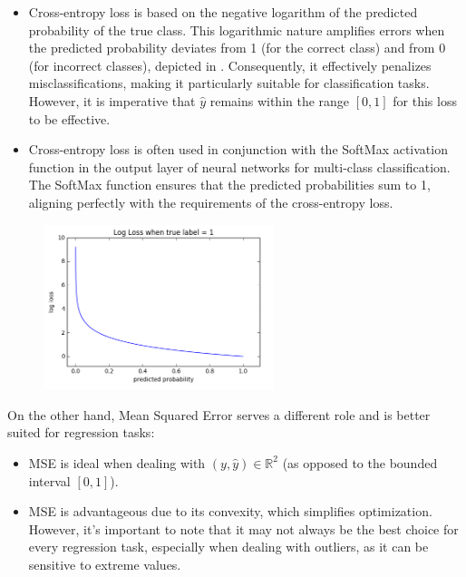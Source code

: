 \begin{itemize}
    \item Cross-entropy loss is based on the negative logarithm of the predicted probability of the true class. This logarithmic nature amplifies errors when the predicted probability deviates from 1 (for the correct class) and from 0 (for incorrect classes), depicted in . Consequently, it effectively penalizes misclassifications, making it particularly suitable for classification tasks. However, it is imperative that $\hat{y}$ remains within the range $[0, 1]$ for this loss to be effective.
    \item Cross-entropy loss is often used in conjunction with the SoftMax activation function in the output layer of neural networks for multi-class classification. The SoftMax function ensures that the predicted probabilities sum to 1, aligning perfectly with the requirements of the cross-entropy loss.
\end{itemize}

\begin{figure}[H]
    \centering
    \includegraphics*[width=0.6\textwidth]{figs/cross_entropy.png}
    \caption{}
    \label{fig:CELoss}
\end{figure}

On the other hand, Mean Squared Error serves a different role and is better suited for regression tasks:

\begin{itemize}
    \item MSE is ideal when dealing with $(y, \hat{y}) \in \mathbb{R}^2$ (as opposed to the bounded interval $[0, 1]$).
    \item MSE is advantageous due to its convexity, which simplifies optimization. However, it's important to note that it may not always be the best choice for every regression task, especially when dealing with outliers, as it can be sensitive to extreme values.
\end{itemize}

